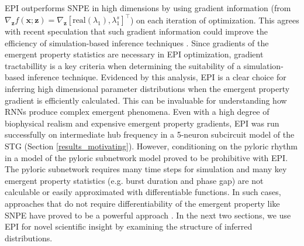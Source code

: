 \documentclass[11pt]{article}
\begin{document}
EPI outperforms SNPE in high dimensions by using gradient information (from $\nabla_\mathbf{z} f(\mathbf{x}; \mathbf{z}) = \nabla_\mathbf{z} [\text{real}(\lambda_1), \lambda_1^s]^\top$) on each iteration of optimization.
This agrees with recent speculation that such gradient information could improve the efficiency of simulation-based inference techniques \cite{cranmer2020frontier}.
Since gradients of the emergent property statistics are necessary in EPI optimization, gradient tractabillity is a key criteria when determining the suitability of a simulation-based inference technique.
Evidenced by this analysis, EPI is a clear choice for inferring high dimensional parameter distributions when the emergent property gradient is efficiently calculated.
This can be invaluable for understanding how RNNs produce complex emergent phenomena.
Even with a high degree of biophysical realism and expensive emergent property gradients, EPI was run successfully on intermediate hub frequency in a 5-neuron subcircuit model of the STG (Section \ref{results_motivating}).
However, conditioning on the pyloric rhythm \cite{marder1992dynamic} in a model of the pyloric subnetwork model \cite{prinz2004similar} proved to be prohibitive with EPI.
The pyloric subnetwork requires many time steps for simulation and many key emergent property statistics (e.g. burst duration and phase gap) are not calculable or easily approximated with differentiable functions.
In such cases, approaches that do not require differentiability of the emergent property like SNPE have proved to be a powerful approach \cite{gonccalves2019training}.
In the next two sections, we use EPI for novel scientific insight by examining the structure of inferred distributions.
\end{document}

